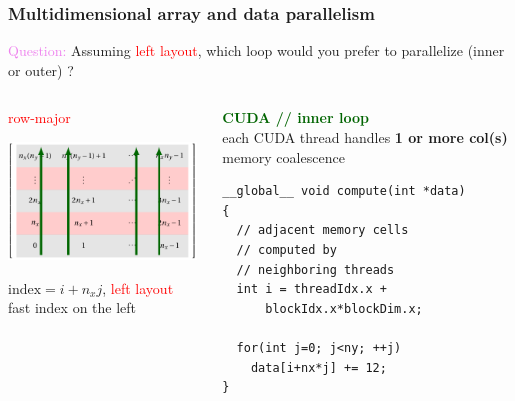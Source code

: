 \begin{frame}[fragile=singleslide]
  \frametitle{Multidimensional array and data parallelism}

  \begin{block}{}
    {\large \textcolor{violet}{Question:}
    Assuming \textcolor{red}{left layout}, which loop would you prefer to parallelize (inner or outer) ?}    
  \end{block}
  
  \begin{columns}
    \begin{column}{0.48\textwidth}
      \begin{center}
        \textcolor{red}{\large row-major}
        
        \includegraphics[width=5cm]{images/tikz/row-major-cuda}

        $\text{index} = i + n_x j$, \textcolor{red}{left layout}\\
        fast index on the left
      \end{center}
    \end{column}
    \begin{column}{0.48\textwidth}
      \begin{center}
        \textcolor{darkgreen}{\bf CUDA // inner loop}\\
        each CUDA thread handles {\bf1 or more col(s)}\\
        memory coalescence
      \end{center}
      {\small
        \begin{verbatim}
__global__ void compute(int *data)
{
  // adjacent memory cells
  // computed by
  // neighboring threads
  int i = threadIdx.x +
      blockIdx.x*blockDim.x;
  
  for(int j=0; j<ny; ++j)
    data[i+nx*j] += 12;
}
\end{verbatim}
}
    \end{column}
    \hfill
  \end{columns}
\end{frame}

